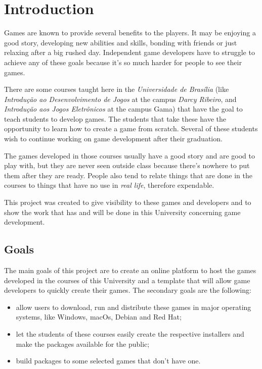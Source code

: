 \chapter*[Introduction]{Introduction}

Games are known to provide several benefits to the players. It may be enjoying a good story, developing new abilities and skills, bonding with friends or just relaxing after a big rushed day. Independent game developers have to struggle to achieve any of these goals because it's so much harder for people to see their games.

There are some courses taught here in the \textit{Universidade de Bras\'ilia} (like \textit{Introdução ao Desenvolvimento de Jogos} at the campus \textit{Darcy Ribeiro}, and \textit{Introdução aos Jogos Eletrônicos} at the campus Gama) that have the goal to teach students to develop games. The students that take these have the opportunity to learn how to create a game from scratch. Several of these students wish to continue working on game development after their graduation.

The games developed in those courses usually have a good story and are good to play with, but they are never seen outside class because there's nowhere to put them after they are ready. People also tend to relate things that are done in the courses to things that have no use in \textit{real life}, therefore expendable.

This project was created to give visibility to these games and developers and to show the work that has and will be done in this University concerning game development.

\section*{Goals}

The main goals of this project are to create an online platform to host the games developed in the courses of this University and a template that will allow game developers to quickly create their games. The secondary goals are the following:

\begin{itemize}
\item allow users to download, run and distribute these games in major operating systems, like Windows, macOs, Debian and Red Hat;
\item let the students of these courses easily create the respective installers and make the packages available for the public;
\item build packages to some selected games that don't have one.
\end{itemize}

